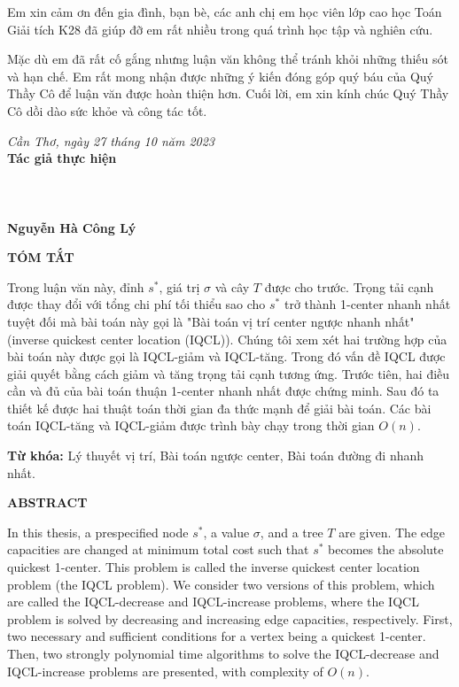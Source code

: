 \documentclass[12pt,oneside,a4paper]{bookAnh1}
\theoremstyle{plain}
\theoremstyle{nonumberplain}
\numberwithin{equation}{chapter}
\begin{document}
Em xin cảm ơn đến gia đình, bạn bè, các anh chị em học viên lớp cao học Toán Giải tích K28 đã giúp đỡ em rất nhiều trong quá trình học tập và nghiên cứu.

Mặc dù em đã rất cố gắng nhưng luận văn không thể tránh khỏi những thiếu sót và hạn chế. Em rất mong nhận được những  ý kiến đóng góp quý báu của Quý Thầy Cô để luận văn được hoàn thiện hơn. Cuối lời, em xin kính chúc Quý Thầy Cô dồi dào sức khỏe và công tác tốt.
\vspace*{0.5cm}

\hspace*{02in}\hfill{\textit{Cần Thơ, ngày 27 tháng 10 năm 2023}}  \\
\hspace*{11cm} {\textbf{Tác giả thực hiện}}  \\
\\
\\
\\
\hspace*{10.5cm} { \bf Nguyễn Hà Công Lý }
\newpage
\centerline{\bf\fontsize{14pt}{120}\selectfont TÓM TẮT}
\vskip1cm
 Trong luận văn này, đỉnh $s^*$, giá trị $\sigma $ và cây $T$ được cho trước. Trọng tải cạnh được thay đổi với tổng chi phí tối thiểu sao cho $s^*$ trở thành 1-center nhanh nhất tuyệt đối mà bài toán này gọi là "Bài toán vị trí center ngược nhanh nhất" (inverse quickest center location (IQCL)). Chúng tôi xem xét hai trường hợp của bài toán này được gọi là IQCL-giảm và IQCL-tăng. Trong đó vấn đề IQCL được giải quyết bằng cách giảm và tăng trọng tải cạnh tương ứng. Trước tiên, hai điều cần và đủ của bài toán thuận 1-center nhanh nhất được chứng minh. Sau đó ta thiết kế được hai thuật toán thời gian đa thức mạnh để giải bài toán. Các bài toán IQCL-tăng và IQCL-giảm được trình bày chạy trong thời gian $O\left( n \right).$
 
\textbf{Từ khóa:} Lý thuyết vị trí, Bài toán ngược center, Bài toán đường đi nhanh nhất.
\newpage
\centerline{\bf\fontsize{14pt}{120}\selectfont ABSTRACT}
\vskip1cm
In this thesis, a prespecified node $s^*$, a value $\sigma$, and a tree $T$ are given. The edge capacities are changed at minimum total cost such that $s^*$ becomes the absolute quickest 1-center. This problem is called the inverse quickest center location problem (the IQCL problem). We consider two versions of this problem, which are called the IQCL-decrease and IQCL-increase problems, where the IQCL problem is solved by decreasing and increasing edge capacities, respectively. First, two necessary and sufficient conditions for a vertex being a quickest 1-center. Then, two strongly polynomial time algorithms to solve the IQCL-decrease and IQCL-increase problems are presented, with complexity of $O(n)$. 
\end{document}

